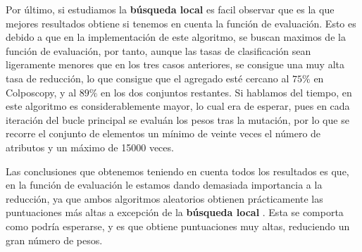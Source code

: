 \documentclass[size=a4, parskip=half, titlepage=false, toc=flat, toc=bib, 12pt]{scrartcl}
\begin{document}
Por último, si estudiamos la \textbf{búsqueda local} es facil observar que es la que mejores resultados obtiene si tenemos en cuenta la función de evaluación. Esto es debido a que en la implementación de este algoritmo, se buscan maximos de la función de evaluación, por tanto, aunque las tasas de clasificación sean ligeramente menores que en los tres casos anteriores, se consigue una muy alta tasa de reducción, lo que consigue que el agregado esté cercano al $75\%$ en Colposcopy, y al  $89\%$ en los dos conjuntos restantes. Si hablamos del tiempo, en este algoritmo es considerablemente mayor, lo cual era de esperar, pues en cada iteración del bucle principal se evaluán los pesos tras la mutación, por lo que se recorre el conjunto de elementos un mínimo de veinte veces el número de atributos y un máximo de 15000 veces.

Las conclusiones que obtenemos teniendo en cuenta todos los resultados es que, en la función de evaluación le estamos dando demasiada importancia a la reducción, ya que ambos algoritmos aleatorios obtienen prácticamente las puntuaciones más altas a excepción de la \textbf{búsqueda local}  . Esta se comporta como podría esperarse, y es que obtiene puntuaciones muy altas, reduciendo un gran número de pesos.
\end{document}
